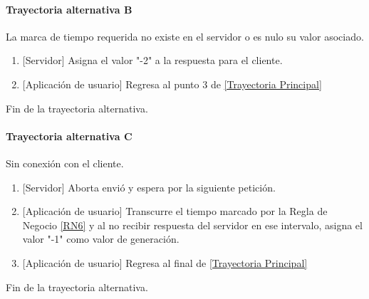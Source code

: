 \paragraph{Trayectoria alternativa B} \label{SUB-M-CU5:TB}
	La marca de tiempo requerida no existe en el servidor o es nulo su valor asociado.
	\begin{enumerate}[label=B\arabic*.]
		\item {[Servidor]} Asigna el valor "-2" a la respuesta para el cliente.
		\item {[Aplicación de usuario]} Regresa al punto 3 de \hyperref[SUB-M-CU5:TP]{[Trayectoria Principal]}
	\end{enumerate}
	Fin de la trayectoria alternativa.

\paragraph{Trayectoria alternativa C} \label{SUB-M-CU5:TC}
	Sin conexión con el cliente.
	\begin{enumerate}[label=C\arabic*.]
		\item {[Servidor]} Aborta envió y espera por la siguiente petición.
		\item {[Aplicación de usuario]} Transcurre el tiempo marcado por la Regla de Negocio \ref{RN6} y al no recibir respuesta del servidor en ese intervalo, asigna el valor "-1" como valor de generación.
		\item {[Aplicación de usuario]} Regresa al final de \hyperref[SUB-M-CU5:TP]{[Trayectoria Principal]}
	\end{enumerate}
	Fin de la trayectoria alternativa.
